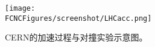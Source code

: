 \begin{figure}[htb]
\centering
\texttt{[image: \\FCNCFigures/screenshot/LHCacc.png]}
\caption{CERN的加速过程与对撞实验示意图。}
\label{fig:LHCacc}
\end{figure}